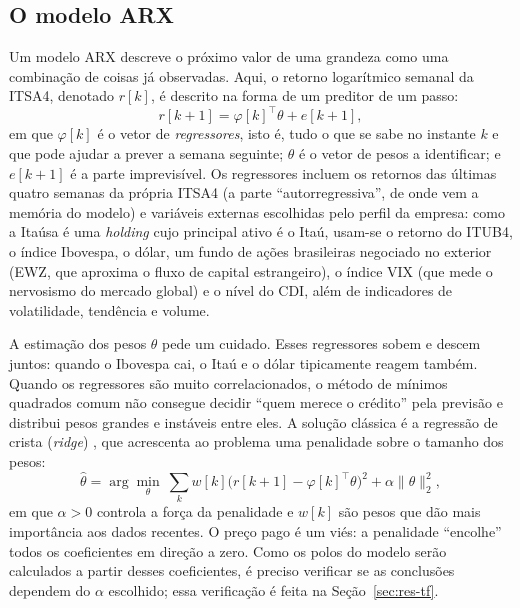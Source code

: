 \documentclass[conference]{IEEEtran}
\begin{document}
\subsection{O modelo ARX}

Um modelo ARX descreve o próximo valor de uma grandeza como uma combinação de coisas já observadas. Aqui, o retorno logarítmico semanal da ITSA4, denotado $r[k]$, é descrito na forma de um preditor de um passo:
\begin{equation}
r[k+1] = \varphi[k]^{\top}\theta + e[k+1],
\label{eq:arx}
\end{equation}
em que $\varphi[k]$ é o vetor de \emph{regressores}, isto é, tudo o que se sabe no instante $k$ e que pode ajudar a prever a semana seguinte; $\theta$ é o vetor de pesos a identificar; e $e[k+1]$ é a parte imprevisível. Os regressores incluem os retornos das últimas quatro semanas da própria ITSA4 (a parte ``autorregressiva'', de onde vem a memória do modelo) e variáveis externas escolhidas pelo perfil da empresa: como a Itaúsa é uma \emph{holding} cujo principal ativo é o Itaú, usam-se o retorno do ITUB4, o índice Ibovespa, o dólar, um fundo de ações brasileiras negociado no exterior (EWZ, que aproxima o fluxo de capital estrangeiro), o índice VIX (que mede o nervosismo do mercado global) e o nível do CDI, além de indicadores de volatilidade, tendência e volume.

A estimação dos pesos $\theta$ pede um cuidado. Esses regressores sobem e descem juntos: quando o Ibovespa cai, o Itaú e o dólar tipicamente reagem também. Quando os regressores são muito correlacionados, o método de mínimos quadrados comum não consegue decidir ``quem merece o crédito'' pela previsão e distribui pesos grandes e instáveis entre eles. A solução clássica é a regressão de crista (\emph{ridge}) \cite{hoerl1970}, que acrescenta ao problema uma penalidade sobre o tamanho dos pesos:
\begin{equation}
\hat{\theta} = \arg\min_{\theta}\ \sum_k w[k]\bigl(r[k+1]-\varphi[k]^{\top}\theta\bigr)^2 + \alpha\lVert\theta\rVert_2^2,
\label{eq:ridge}
\end{equation}
em que $\alpha>0$ controla a força da penalidade e $w[k]$ são pesos que dão mais importância aos dados recentes. O preço pago é um viés: a penalidade ``encolhe'' todos os coeficientes em direção a zero. Como os polos do modelo serão calculados a partir desses coeficientes, é preciso verificar se as conclusões dependem do $\alpha$ escolhido; essa verificação é feita na Seção~\ref{sec:res-tf}.
\end{document}
